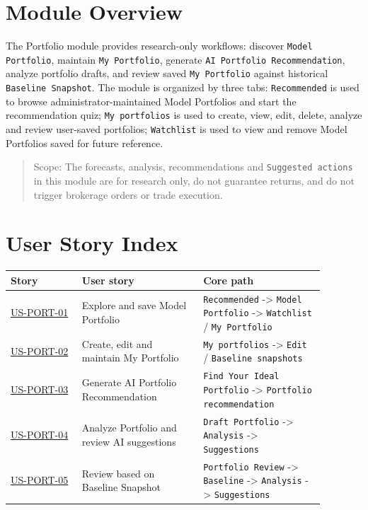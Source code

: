 \section{Module Overview}
The Portfolio module provides research-only workflows: discover \texttt{Model Portfolio}, maintain \texttt{My Portfolio}, generate \texttt{AI Portfolio Recommendation}, analyze portfolio drafts, and review saved \texttt{My Portfolio} against historical \texttt{Baseline Snapshot}.
The module is organized by three tabs: \texttt{Recommended} is used to browse administrator-maintained Model Portfolios and start the recommendation quiz; \texttt{My portfolios} is used to create, view, edit, delete, analyze and review user-saved portfolios; \texttt{Watchlist} is used to view and remove Model Portfolios saved for future reference.
\begin{quote}\small Scope: The forecasts, analysis, recommendations and \texttt{Suggested actions} in this module are for research only, do not guarantee returns, and do not trigger brokerage orders or trade execution.\end{quote}
\section{User Story Index}
\begingroup
\small
\begin{longtable}{L{0.20\linewidth}L{0.34\linewidth}L{0.34\linewidth}}
\toprule
\textbf{Story} & \textbf{User story} & \textbf{Core path} \\
\midrule
\hyperlink{us-port-01}{US-PORT-01} & Explore and save Model Portfolio & \texttt{Recommended} -\textgreater{} \texttt{Model Portfolio} -\textgreater{} \texttt{Watchlist} /\allowbreak{} \texttt{My Portfolio} \\
\hyperlink{us-port-02}{US-PORT-02} & Create, edit and maintain My Portfolio & \texttt{My portfolios} -\textgreater{} \texttt{Edit} /\allowbreak{} \texttt{Baseline snapshots} \\
\hyperlink{us-port-03}{US-PORT-03} & Generate AI Portfolio Recommendation & \texttt{Find Your Ideal Portfolio} -\textgreater{} \texttt{Portfolio recommendation} \\
\hyperlink{us-port-04}{US-PORT-04} & Analyze Portfolio and review AI suggestions & \texttt{Draft Portfolio} -\textgreater{} \texttt{Analysis} -\textgreater{} \texttt{Suggestions} \\
\hyperlink{us-port-05}{US-PORT-05} & Review based on Baseline Snapshot & \texttt{Portfolio Review} -\textgreater{} \texttt{Baseline} -\textgreater{} \texttt{Analysis} -\textgreater{} \texttt{Suggestions} \\
\bottomrule
\end{longtable}
\endgroup
